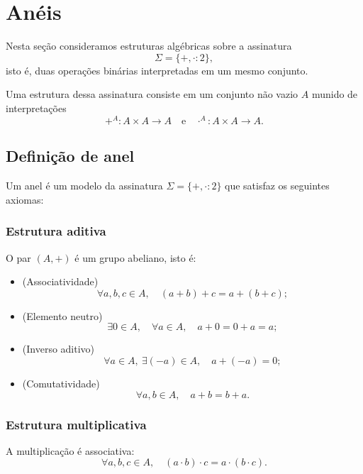 \documentclass[../../main]{subfiles}
\begin{document}
\section{Anéis}
\label{sec:matematica:algebra:estruturas-algebricas:aneis}

Nesta seção consideramos estruturas algébricas sobre a assinatura
\[
	\Sigma = \{+, \cdot : 2\},
\]
isto é, duas operações binárias interpretadas em um mesmo conjunto.

Uma estrutura dessa assinatura consiste em um conjunto não vazio $A$ munido de interpretações
\[
	+^A : A \times A \to A
	\quad \text{e} \quad
	\cdot^A : A \times A \to A.
\]

\subsection{Definição de anel}

Um anel é um modelo da assinatura $\Sigma = \{+, \cdot : 2\}$ que satisfaz os seguintes axiomas:

\subsubsection{Estrutura aditiva}

O par $(A,+)$ é um grupo abeliano, isto é:

\begin{itemize}
	\item (Associatividade)
	      \[
		      \forall a,b,c \in A,\quad (a+b)+c = a+(b+c);
	      \]

	\item (Elemento neutro)
	      \[
		      \exists 0 \in A,\quad \forall a \in A,\quad a+0 = 0+a = a;
	      \]

	\item (Inverso aditivo)
	      \[
		      \forall a \in A,\ \exists (-a) \in A,\quad a+(-a)=0;
	      \]

	\item (Comutatividade)
	      \[
		      \forall a,b \in A,\quad a+b = b+a.
	      \]
\end{itemize}

\subsubsection{Estrutura multiplicativa}

A multiplicação é associativa:
\[
	\forall a,b,c \in A,\quad (a \cdot b)\cdot c = a \cdot (b \cdot c).
\]
\end{document}

